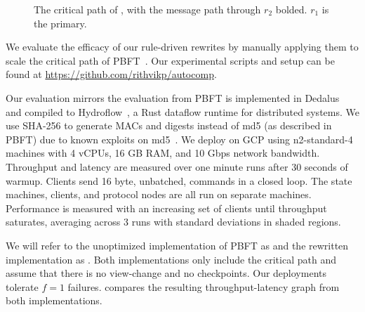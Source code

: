 \begin{figure}[t]
     \caption{The critical path of \ScalablePBFT{}, with the message path through $r_2$ bolded. $r_1$ is the primary.}
    \label{fig:decoupledPBFT}
\end{figure}

We evaluate the efficacy of our rule-driven rewrites by manually applying them to scale the critical path of PBFT~\cite{pbft}.
Our experimental scripts and setup can be found at \url{https://github.com/rithvikp/autocomp}.

Our evaluation mirrors the evaluation from \sigmodpaper{}
PBFT is implemented in Dedalus~\cite{dedalus} and compiled to Hydroflow~\cite{hydroflow}, a Rust dataflow runtime for distributed systems.
We use SHA-256 to generate MACs and digests instead of md5 (as described in PBFT) due to known exploits on md5~\cite{breakMD5}.
We deploy on GCP using n2-standard-4 machines with 4 vCPUs, 16 GB RAM, and 10 Gbps network bandwidth.
Throughput and latency are measured over one minute runs after 30 seconds of warmup.
Clients send 16 byte, unbatched, commands in a closed loop.
The state machines, clients, and protocol nodes are all run on separate machines.
Performance is measured with an increasing set of clients until throughput saturates, averaging across 3 runs with standard deviations in shaded regions.

We will refer to the unoptimized implementation of PBFT as \BasePBFT{} and the rewritten implementation as \ScalablePBFT{}.
Both implementations only include the critical path and assume that there is no view-change and no checkpoints.
Our deployments tolerate $f=1$ failures.
 compares the resulting throughput-latency graph from both implementations.

